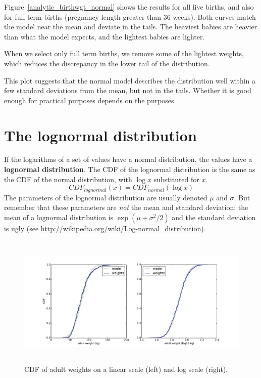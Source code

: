 \documentclass[12pt]{book}
\begin{document}
Figure~\ref{analytic_birthwgt_normal} shows the results for
all live births, and also for full term births (pregnancy length greater
than 36 weeks).  Both curves match the model near the mean and
deviate in the tails.  The heaviest babies are heavier than what
the model expects, and the lightest babies are lighter.

When we select only full term births, we remove some of the lightest
weights, which reduces the discrepancy in the lower tail of the
distribution.

This plot suggests that the normal model describes the distribution
well within a few standard deviations from the mean, but not in the
tails.  Whether it is good enough for practical purposes depends
on the purposes.


\section{The lognormal distribution}
\label{brfss}
\label{lognormal}

If the logarithms of a set of values have a normal distribution, the
values have a {\bf lognormal distribution}.  The CDF of the lognormal
distribution is the same as the CDF of the normal distribution,
with $\log x$ substituted for $x$.
%
\[ CDF_{lognormal}(x) = CDF_{normal}(\log x)\]
%
The parameters of the lognormal distribution are usually denoted
$\mu$ and $\sigma$.  But remember that these parameters are {\em not}
the mean and standard deviation; the mean of a lognormal distribution
is $\exp(\mu +\sigma^2/2)$ and the standard deviation is
ugly (see \url{http://wikipedia.org/wiki/Log-normal_distribution}).
  

\begin{figure}
\centerline{
\includegraphics[height=2.5in]{figs/brfss_weight.pdf}}
\caption{CDF of adult weights on a linear scale (left) and
log scale (right).}
\label{brfss_weight}
\end{figure}
\end{document}

